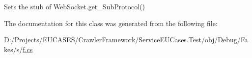 Sets the stub of Web\-Socket.\-get\-\_\-\-Sub\-Protocol()



The documentation for this class was generated from the following file\-:\begin{DoxyCompactItemize}
\item 
D\-:/\-Projects/\-E\-U\-C\-A\-S\-E\-S/\-Crawler\-Framework/\-Service\-E\-U\-Cases.\-Test/obj/\-Debug/\-Fakes/s/\hyperlink{s_2f_8cs}{f.\-cs}\end{DoxyCompactItemize}
